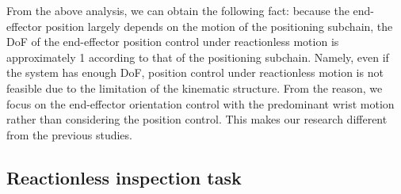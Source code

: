 \documentclass[preprint,12pt]{elsarticle}
\def\R#1{{\in\mathbb{R}^{#1}}}
\def\thd{{\dot{\bbm{\theta}}}}
\def\th{{\bbm{\theta}}}
\def\tbm#1{{\tilde{\bbm{#1}}}}
\def\bmat#1{{\begin{bmatrix} #1 \end{bmatrix}}}
\def\bbm#1{\bm{#1}}
\begin{document}


From the above analysis, we can obtain the following fact:
because the end-effector position largely depends on the motion of the positioning subchain,
the DoF of the end-effector position control under reactionless motion
is approximately 1 according to that of the positioning subchain.
Namely, even if the system has enough DoF,
position control under reactionless motion is not feasible due to the limitation of
the kinematic structure.
From the reason,
we focus on the end-effector orientation control with the predominant wrist motion
rather than considering the position control.
This makes our research different from the previous studies.


\subsection{Reactionless inspection task}
\label{sec:INSPECTION}
\end{document}
